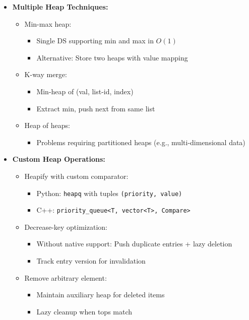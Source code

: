 \documentclass[a4paper,10pt]{book}
\begin{document}
\begin{itemize}
    \item \textbf{Multiple Heap Techniques:}
    \begin{itemize}
        \item Min-max heap:
        \begin{itemize}
            \item Single DS supporting min and max in $O(1)$
            \item Alternative: Store two heaps with value mapping
        \end{itemize}
        \item K-way merge:
        \begin{itemize}
            \item Min-heap of (val, list-id, index)
            \item Extract min, push next from same list
        \end{itemize}
        \item Heap of heaps:
        \begin{itemize}
            \item Problems requiring partitioned heaps (e.g., multi-dimensional data)
        \end{itemize}
    \end{itemize}
    
    \item \textbf{Custom Heap Operations:}
    \begin{itemize}
        \item Heapify with custom comparator:
        \begin{itemize}
            \item Python: \texttt{heapq} with tuples \texttt{(priority, value)}
            \item C++: \texttt{priority\_queue<T, vector<T>, Compare>}
        \end{itemize}
        \item Decrease-key optimization:
        \begin{itemize}
            \item Without native support: Push duplicate entries + lazy deletion
            \item Track entry version for invalidation
        \end{itemize}
        \item Remove arbitrary element:
        \begin{itemize}
            \item Maintain auxiliary heap for deleted items
            \item Lazy cleanup when tops match
        \end{itemize}
    \end{itemize}
    

\end{itemize}
\end{document}
